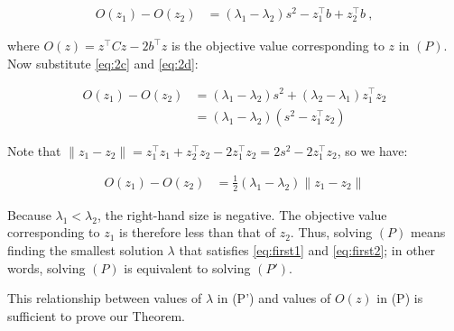 \documentclass[10pt,letterpaper]{article}
\begin{document}
\begin{align*}
O(z_1) - O(z_2) &= (\lambda_1 - \lambda_2)s^2 - z_1^\top b + z_2^\top b~,
\end{align*}


where $O(z)=z^\top C z - 2b^\top z$ is the objective value corresponding to $z$ in $(P)$. Now substitute \eqref{eq:2c} and \eqref{eq:2d}:


\begin{align*}
O(z_1) - O(z_2) &= (\lambda_1 - \lambda_2)s^2 + (\lambda_2 - \lambda_1) z_1^\top z_2 \\
&=  (\lambda_1 - \lambda_2)(s^2 - z_1^\top z_2)
\end{align*}


Note that $\lVert z_1 - z_2 \rVert = z_1^\top z_1 + z_2^\top z_2 - 2z_1^\top z_2 = 2s^2 - 2z_1^\top z_2$, so we have:


\begin{align*}
O(z_1) - O(z_2) &= \frac{1}{2}(\lambda_1 - \lambda_2)\lVert z_1 - z_2 \rVert
\end{align*}


Because $\lambda_1 < \lambda_2$, the right-hand size is negative. The objective value corresponding to $z_1$ is therefore less than that of $z_2$. Thus, solving $(P)$ means finding the smallest solution $\lambda$ that satisfies \eqref{eq:first1} and \eqref{eq:first2}; in other words, solving $(P)$ is equivalent to solving $(P')$.

This relationship between values of $\lambda$ in (P') and values of $O(z)$ in (P) is sufficient to prove our Theorem.



\end{document}
